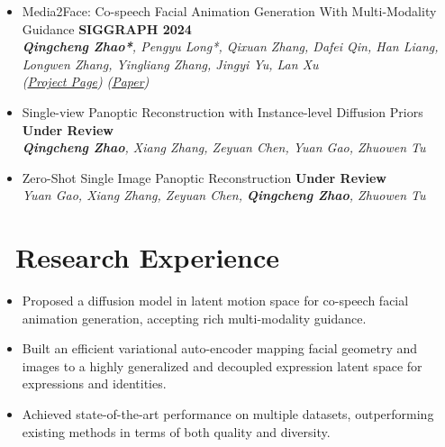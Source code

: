 \documentclass{resume}
\begin{document}
\begin{itemize}
  \item {\small \cite{zhao2024media2face} Media2Face: Co-speech Facial Animation Generation With Multi-Modality Guidance} \hfill{\textbf{SIGGRAPH 2024}}\\
        \textit{\footnotesize \textbf{Qingcheng Zhao*}, Pengyu Long*, Qixuan Zhang, Dafei Qin, Han Liang, Longwen Zhang, Yingliang Zhang, Jingyi Yu, Lan Xu}\\
        \textit{(\href{https://sites.google.com/view/media2face}{Project Page})}
        \textit{(\href{https://dl.acm.org/doi/10.1145/3641519.3657413}{Paper})}
      
  \item {Single-view Panoptic Reconstruction with Instance-level Diffusion Priors} \hfill{\textbf{Under Review}}\\
        \textit{\small \textbf{Qingcheng Zhao}, Xiang Zhang, Zeyuan Chen, Yuan Gao, Zhuowen Tu}\\

  \item {Zero-Shot Single Image Panoptic Reconstruction} \hfill{\textbf{Under Review}}\\
        \textit{\small Yuan Gao, Xiang Zhang, Zeyuan Chen, \textbf{Qingcheng Zhao}, Zhuowen Tu}\\
\end{itemize}


\section{\faFlask\ Research Experience}



\begin{itemize}
  \item Proposed a diffusion model in latent motion space for co-speech facial animation generation, accepting rich multi-modality guidance.
  \item Built an efficient variational auto-encoder mapping facial geometry and images to a highly generalized and decoupled expression latent space for expressions and identities.
  \item Achieved state-of-the-art performance on multiple datasets, outperforming existing methods in terms of both quality and diversity.
\end{itemize}
\end{document}

